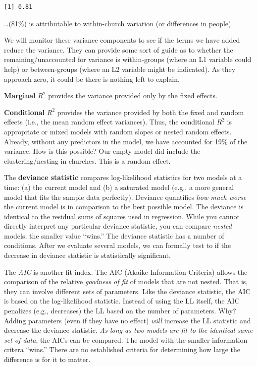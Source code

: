 \documentclass[
  11pt,
]{book}
\begin{document}
\begin{verbatim}
[1] 0.81
\end{verbatim}

\ldots(81\%) is attributable to within-church variation (or differences in people).

We will monitor these variance components to see if the terms we have added reduce the variance. They can provide some sort of guide as to whether the remaining/unaccounted for variance is within-groups (where an L1 variable could help) or between-groups (where an L2 variable might be indicated). As they approach zero, it could be there is nothing left to explain.

\textbf{Marginal} \(R^2\) provides the variance provided only by the fixed effects.

\textbf{Conditional} \(R^2\) provides the variance provided by both the fixed and random effects (i.e., the mean random effect variances). Thus, the conditional \(R^2\) is appropriate or mixed models with random slopes or nested random effects. Already, without any predictors in the model, we have accounted for 19\% of the variance. How is this possible? Our empty model did include the clustering/nesting in churches. This is a random effect.

The \textbf{deviance statistic} compares log-likelihood statistics for two models at a time: (a) the current model and (b) a saturated model (e.g., a more general model that fits the sample data perfectly). Deviance quantifies \emph{how much worse} the current model is in comparison to the best possible model. The deviance is identical to the residual sums of squares used in regression. While you cannot directly interpret any particular deviance statistic, you can compare \emph{nested} models; the smaller value ``wins.'' The deviance statistic has a number of conditions. After we evaluate several models, we can formally test to if the decrease in deviance statistic is statistically significant.

The \emph{AIC} is another fit index. The AIC (Akaike Information Criteria) allows the comparison of the relative \emph{goodness of fit} of models that are not nested. That is, they can involve different sets of parameters. Like the deviance statistic, the AIC is based on the log-likelihood statistic. Instead of using the LL itself, the AIC penalizes (e.g., decreases) the LL based on the number of parameters. Why? Adding parameters (even if they have no effect) \emph{will} increase the LL statistic and decrease the deviance statistic. \emph{As long as two models are fit to the identical same set of data}, the AICs can be compared. The model with the smaller information critera ``wins.'' There are no established criteria for determining how large the difference is for it to matter.
\end{document}
